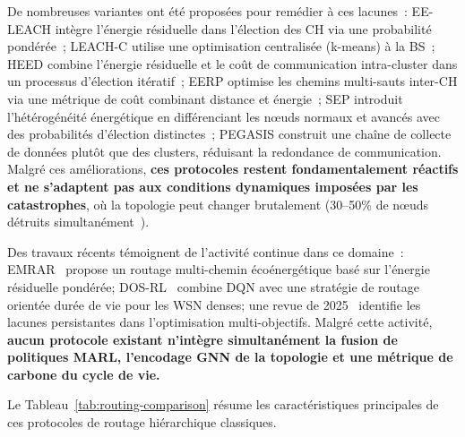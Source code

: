 De nombreuses variantes ont été proposées pour remédier à ces lacunes~: EE-LEACH \cite{kumar2012eeleach} intègre l'énergie résiduelle dans l'élection des CH via une probabilité pondérée~; LEACH-C \cite{heinzelman2002leach} utilise une optimisation centralisée (k-means) à la BS~; HEED \cite{younis2004heed} combine l'énergie résiduelle et le coût de communication intra-cluster dans un processus d'élection itératif~; EERP \cite{sha2013eerp} optimise les chemins multi-sauts inter-CH via une métrique de coût combinant distance et énergie~; SEP \cite{smaragdakis2004sep} introduit l'hétérogénéité énergétique en différenciant les n\oe{}uds normaux et avancés avec des probabilités d'élection distinctes~; PEGASIS \cite{lindsey2002pegasis} construit une chaîne de collecte de données plutôt que des clusters, réduisant la redondance de communication. Malgré ces améliorations, \textbf{ces protocoles restent fondamentalement réactifs et ne s'adaptent pas aux conditions dynamiques imposées par les catastrophes}, où la topologie peut changer brutalement (30--50\% de n\oe{}uds détruits simultanément~\cite{AbuGhazaleh2007WSNSurvivability}).

Des travaux récents témoignent de l'activité continue dans ce domaine~: EMRAR~\cite{emrar_sensors2024} propose un routage multi-chemin écoénergétique basé sur l'énergie résiduelle pondérée; DOS-RL~\cite{dosrl_sensors2023} combine DQN avec une stratégie de routage orientée durée de vie pour les WSN denses; une revue de 2025~\cite{wsn_routing_survey2025} identifie les lacunes persistantes dans l'optimisation multi-objectifs. Malgré cette activité, \textbf{aucun protocole existant n'intègre simultanément la fusion de politiques MARL, l'encodage GNN de la topologie et une métrique de carbone du cycle de vie.}

Le Tableau~\ref{tab:routing-comparison} résume les caractéristiques principales de ces protocoles de routage hiérarchique classiques.

